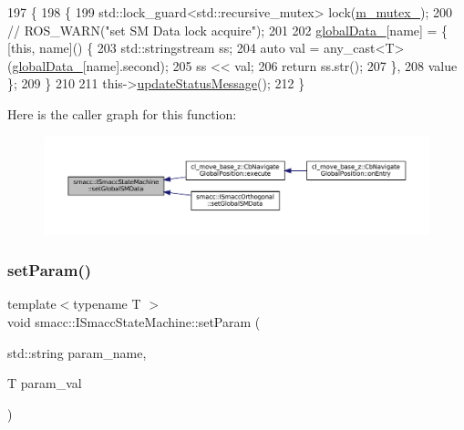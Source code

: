 \begin{DoxyCode}
197 \{
198   \{
199     std::lock\_guard<std::recursive\_mutex> lock(\hyperlink{classsmacc_1_1ISmaccStateMachine_aac785541646e5c517273bf31072505a1}{m\_mutex\_});
200     \textcolor{comment}{// ROS\_WARN("set SM Data lock acquire");}
201 
202     \hyperlink{classsmacc_1_1ISmaccStateMachine_ad2f9dae184ea942db632ac4532a10a91}{globalData\_}[name] = \{ [\textcolor{keyword}{this}, name]() \{
203                            std::stringstream ss;
204                            \textcolor{keyword}{auto} val = any\_cast<T>(\hyperlink{classsmacc_1_1ISmaccStateMachine_ad2f9dae184ea942db632ac4532a10a91}{globalData\_}[name].second);
205                            ss << val;
206                            \textcolor{keywordflow}{return} ss.str();
207                          \},
208                           value \};
209   \}
210 
211   this->\hyperlink{classsmacc_1_1ISmaccStateMachine_ad246a49015fadaeb0b1639d7ab99f7d0}{updateStatusMessage}();
212 \}
\end{DoxyCode}
Here is the caller graph for this function\+:
\nopagebreak
\begin{figure}[H]
\begin{center}
\leavevmode
\includegraphics[width=350pt]{classsmacc_1_1ISmaccStateMachine_a8588f9e580fbb95b53e2bd2ca3ff1f98_icgraph}
\end{center}
\end{figure}
\mbox{\label{classsmacc_1_1ISmaccStateMachine_afc730437f45fa107292c078dfab2aa37}} 
\subsubsection{\texorpdfstring{set\+Param()}{setParam()}}
{\footnotesize\ttfamily template$<$typename T $>$ \\
void smacc\+::\+I\+Smacc\+State\+Machine\+::set\+Param (\begin{DoxyParamCaption}\item[{std\+::string}]{param\+\_\+name,  }\item[{T}]{param\+\_\+val }\end{DoxyParamCaption})\hspace{0.3cm}{\ttfamily [protected]}}



